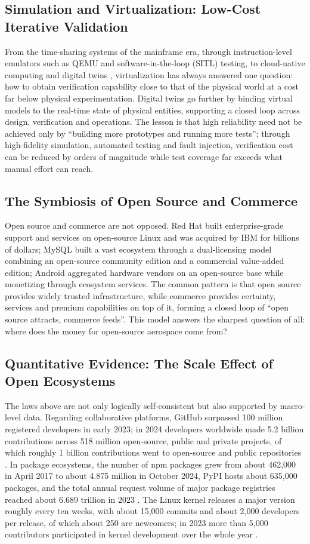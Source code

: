 \documentclass[11pt]{article}
\begin{document}
\subsection{Simulation and Virtualization: Low-Cost Iterative Validation}
From the time-sharing systems of the mainframe era, through instruction-level emulators such as QEMU and software-in-the-loop (SITL) testing, to cloud-native computing and digital twins \cite{glaessgen2012,grieves2017}, virtualization has always answered one question: how to obtain verification capability close to that of the physical world at a cost far below physical experimentation. Digital twins go further by binding virtual models to the real-time state of physical entities, supporting a closed loop across design, verification and operations. The lesson is that high reliability need not be achieved only by ``building more prototypes and running more tests''; through high-fidelity simulation, automated testing and fault injection, verification cost can be reduced by orders of magnitude while test coverage far exceeds what manual effort can reach.

\subsection{The Symbiosis of Open Source and Commerce}
Open source and commerce are not opposed. Red Hat built enterprise-grade support and services on open-source Linux and was acquired by IBM for billions of dollars; MySQL built a vast ecosystem through a dual-licensing model combining an open-source community edition and a commercial value-added edition; Android aggregated hardware vendors on an open-source base while monetizing through ecosystem services. The common pattern is that open source provides widely trusted infrastructure, while commerce provides certainty, services and premium capabilities on top of it, forming a closed loop of ``open source attracts, commerce feeds''. This model answers the sharpest question of all: where does the money for open-source aerospace come from?

\subsection{Quantitative Evidence: The Scale Effect of Open Ecosystems}
The laws above are not only logically self-consistent but also supported by macro-level data. Regarding collaborative platforms, GitHub surpassed 100 million registered developers in early 2023; in 2024 developers worldwide made 5.2 billion contributions across 518 million open-source, public and private projects, of which roughly 1 billion contributions went to open-source and public repositories \cite{octoverse2024}. In package ecosystems, the number of npm packages grew from about 462,000 in April 2017 to about 4.875 million in October 2024, PyPI hosts about 635,000 packages, and the total annual request volume of major package registries reached about 6.689 trillion in 2023 \cite{sonatype2024}. The Linux kernel releases a major version roughly every ten weeks, with about 15,000 commits and about 2,000 developers per release, of which about 250 are newcomers; in 2023 more than 5,000 contributors participated in kernel development over the whole year \cite{lwn2023}.
\end{document}
